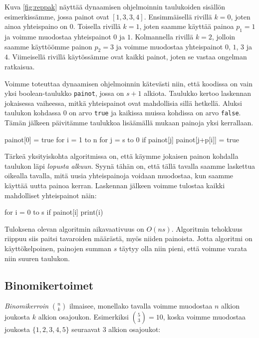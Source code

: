 Kuva \ref{fig:reppak} näyttää dynaamisen ohjelmoinnin
taulukoiden sisällön esimerkissämme, jossa painot ovat $[1,3,3,4]$.
Ensimmäisellä rivillä $k=0$, joten ainoa yhteispaino on $0$.
Toisella rivillä $k=1$, joten saamme käyttää painoa $p_1=1$
ja voimme muodostaa yhteispainot $0$ ja $1$.
Kolmannella rivillä $k=2$, jolloin saamme käyttöömme painon $p_2=3$
ja voimme muodostaa yhteispainot $0$, $1$, $3$ ja $4$.
Viimeisellä rivillä käytössämme ovat kaikki painot,
joten se vastaa ongelman ratkaisua.

Voimme toteuttaa dynaamisen ohjelmoinnin kätevästi niin,
että koodissa on vain yksi boolean-taulukko \texttt{painot},
jossa on $s+1$ alkiota.
Taulukko kertoo laskennan jokaisessa vaiheessa,
mitkä yhteispainot ovat mahdollisia sillä hetkellä.
Aluksi taulukon kohdassa $0$ on arvo \texttt{true} ja
kaikissa muissa kohdissa on arvo \texttt{false}.
Tämän jälkeen päivitämme taulukkoa lisäämällä mukaan
painoja yksi kerrallaan.

\begin{code}
painot[0] = true
for i = 1 to n
    for j = s to 0
        if painot[j]
            painot[j+p[i]] = true
\end{code}

Tärkeä yksityiskohta algoritmissa on,
että käymme jokaisen painon kohdalla taulukon
läpi \emph{lopusta alkuun}.
Syynä tähän on, että tällä tavalla saamme
laskettua oikealla tavalla, mitä uusia yhteispainoja
voidaan muodostaa, kun saamme käyttää uutta painoa kerran.
Laskennan jälkeen voimme tulostaa kaikki
mahdolliset yhteispainot näin:

\begin{code}
for i = 0 to s
    if painot[i]
        print(i)
\end{code}

Tuloksena olevan algoritmin aikavaativuus on $O(ns)$.
Algoritmin tehokkuus riippuu siis paitsi tavaroiden määrästä,
myös niiden painoista.
Jotta algoritmi on käyttökelpoinen, painojen summan $s$
täytyy olla niin pieni, että voimme varata niin suuren taulukon.

\subsection{Binomikertoimet}


\emph{Binomikerroin} $\binom{n}{k}$ ilmaisee, monellako tavalla voimme
muodostaa $n$ alkion joukosta $k$ alkion osajoukon.
Esimerkiksi $\binom{5}{3}=10$, koska voimme muodostaa
joukosta $\{1,2,3,4,5\}$ seuraavat 3 alkion osajoukot:

